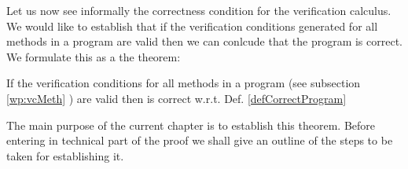 Let us now see informally the correctness condition for the verification calculus. 
We would like to establish that if the verification conditions
generated for all methods in a program are valid then we can conlcude that the program is correct. 
We formulate this as a the theorem:
\begin{vcGenCorrect}\label{vcGenCorrect}
If the verification conditions  for all  methods in a program \Program{}  (see  subsection \ref{wp:vcMeth} )
are valid then \Program{} is correct w.r.t. Def. \ref{defCorrectProgram}
%        

\end{vcGenCorrect}

The main purpose of the current chapter is to establish this theorem. Before entering in technical part of the proof
we shall give an outline of the steps to be taken for establishing it.


